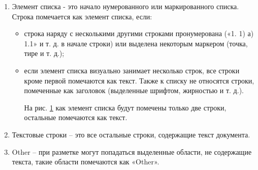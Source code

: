 \documentclass{ProcISPRAS}
\begin{document}
\begin{enumerate}
	\item Элемент списка - это начало нумерованного или маркированного списка. Строка помечается как элемент списка, если:
	\begin{itemize}
		\item строка наряду с несколькими другими строками пронумерована («1. 1) а) 1.1» и т. д. в начале строки) или выделена некоторым маркером (точка, тире и т. д.);
		
		\item если элемент списка визуально занимает несколько строк, все строки кроме первой помечаются как текст. Также к списку не относятся строки, помеченные как заголовок (выделенные шрифтом, жирностью и т. д.).
		
		На рис. \ref{fig:4} как элемент списка будут помечены только две строки, остальные помечаются как текст.
		
		\begin{figure}[ht]
		    \label{fig:4}
		\end{figure}
		
	\end{itemize}
	
	\item Текстовые строки -- это все остальные строки, содержащие текст документа.
	\item Other -- при разметке могут попадаться выделенные области, не содержащие текста, такие области помечаются как «Other».
	
\end{enumerate}
\end{document}
